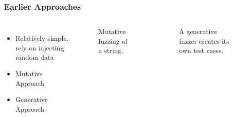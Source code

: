\begin{frame}
\frametitle{Earlier Approaches}
\begin{columns}
\begin{itemize}
\item{Relatively simple, rely on injecting random data}
\item{Mutative Approach}
\item{Generative Approach}
\end{itemize}
\begin{figure}
\caption{Mutative fuzzing of a string.}
\end{figure}
\begin{figure}
\caption{A generative fuzzer creates its own test cases.}
\end{figure}
\end{columns}
\end{frame}
